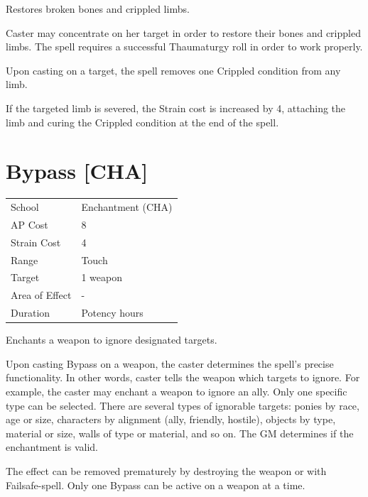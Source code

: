\documentclass[11pt,a4paper,twocolumn]{book}
\begin{document}
\medskip

Restores broken bones and crippled limbs.

Caster may concentrate on her target in order to restore their bones and crippled limbs. The spell requires a successful Thaumaturgy roll in order to work properly.

Upon casting on a target, the spell removes one Crippled condition from any limb.

If the targeted limb is severed, the Strain cost is increased by 4, attaching the limb and curing the Crippled condition at the end of the spell.


\section*{Bypass [CHA]}
{
	\begin{tabu} to 75mm{| X[l,4] | X[l,7] |}
		\hline
		School 			& Enchantment (CHA) 	\\
        AP Cost	      	& 8 					\\
        Strain Cost     & 4 					\\
        Range     		& Touch 				\\
        Target      	& 1 weapon 				\\
        Area of Effect  & - 	 				\\
        Duration     	& Potency hours 		\\ \hline
	\end{tabu}
		
}

\medskip

Enchants a weapon to ignore designated targets.

Upon casting Bypass on a weapon, the caster determines the spell's precise functionality. In other words, caster tells the weapon which targets to ignore. For example, the caster may enchant a weapon to ignore an ally. Only one specific type can be selected. There are several types of ignorable targets: ponies by race, age or size, characters by alignment (ally, friendly, hostile), objects by type, material or size, walls of type or material, and so on. The GM determines if the enchantment is valid.

The effect can be removed prematurely by destroying the weapon or with Failsafe-spell. Only one Bypass can be active on a weapon at a time.
\end{document}
